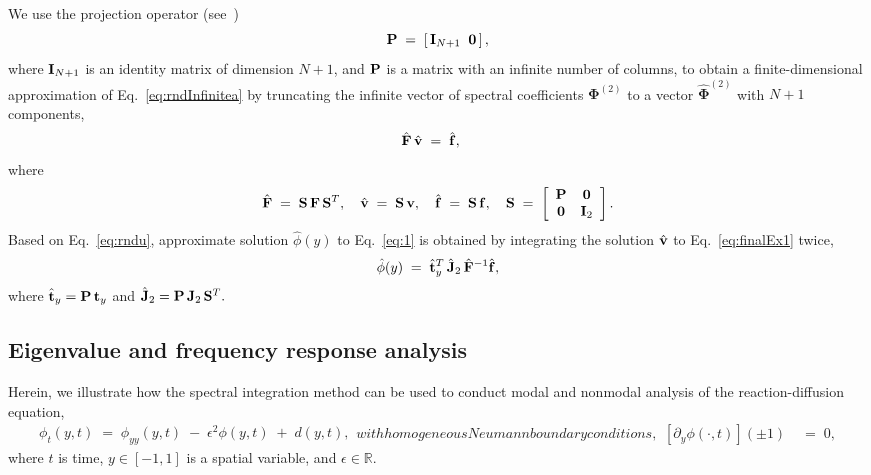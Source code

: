 \documentclass[%
secnumarabic,%
 amssymb, amsmath,%
 aps,prf,superscriptaddress,longbibliography
frontmatterverbose,
]{revtex4-2}
\begin{document}
We use the projection operator (see~\cite[Section 2.4]{OlvTowSIAM2013}) 
\begin{equation}\label{eq:project}
  \mathbf{P} \;=\; \left[\,\mathbf I_{N+1}\;\; \mathbf 0 \,\right],
\end{equation}
where $\mathbf I_{N+1}$ is an identity matrix of dimension $N+1$, and $\mathbf{P}$ is a matrix with an infinite number of columns, to obtain a finite-dimensional approximation of Eq.~\eqref{eq:rndInfinitea} by truncating the infinite vector of spectral coefficients $\boldsymbol \Phi^{(2)}$ to a vector $\hat{\boldsymbol \Phi}^{(2)}$ with $N + 1$ components,
\begin{align}\label{eq:finalEx1}
  \hat{\mathbf{F}}\,\hat{\mathbf{v}} \;&=\; \hat{\mathbf{f}},
\end{align}
where
	\begin{align}
	\label{eq:S}
	\hat{\mathbf{F}} \;=\;  \mathbf{S} \,\mathbf{F} \,\mathbf{S}^T, 
	\quad 
	\hat{\mathbf{v}} \;=\; \mathbf{S}\, \mathbf{v}, 
	\quad 
	\hat{\mathbf{f}} \;=\; \mathbf{S}\, \mathbf{f}, 
	\quad 
	\mathbf{S} 
	\;=\; 
	\left[
	\begin{array}{cc}
        \mathbf{P} & \mathbf 0 \\
        \mathbf 0 & \mathbf{I}_2
        \end{array}
        \right].
	\end{align}
Based on Eq.~\eqref{eq:rndu}, approximate solution $\hat{\phi} (y)$ to Eq.~\eqref{eq:1} is obtained by integrating the solution $\hat{\mathbf{v}}$ to Eq.~\eqref{eq:finalEx1} twice,
	\begin{align}
	\label{eq:finalEx}
  	\hat{\phi} (y) 
	\; = \; 
	\hat{\mathbf{t}}_y^T 
	\, 
	\hat{\mathbf J}_2 
	\,
	\hat{\mathbf{F}}^{-1} 
	\hat{\mathbf{f}},
	\end{align}
where
	$
	\hat{\mathbf{t}}_y 
	= 
	\mathbf{P} \, \mathbf{t}_y
	$
and	
	$ 
	\hat {\mathbf{J}}_2 
	= 
	\mathbf{P} \, \mathbf J_2 \, \mathbf{S}^T.
	$

	\vspace*{-4ex}
	\subsection{Eigenvalue and frequency response analysis}
	\vspace*{-2ex}
Herein, we illustrate how the spectral integration method can be used to conduct modal and nonmodal analysis of the reaction-diffusion equation,
	\begin{subequations}
	\label{eq:rndTrans}
	\begin{align}
	\phi_{t}(y,t) 
	\; = \;  
	\phi_{yy}(y,t)  
	\; - \; 
	\epsilon^2 \phi (y,t) 
	\; + \; 
	d(y,t),
	\label{eq:0}
	\end{align}
with homogeneous Neumann boundary conditions,
\begin{align}
[\partial_y \phi (\cdot, t)](\pm 1) \;& =\; 0, \label{eq:0bc}
\end{align}
\end{subequations}
where $t$ is time, $y \in \left[ -1, 1 \right]$ is a spatial variable, and $ \epsilon \in \mathbb{R}$. 
\end{document}
